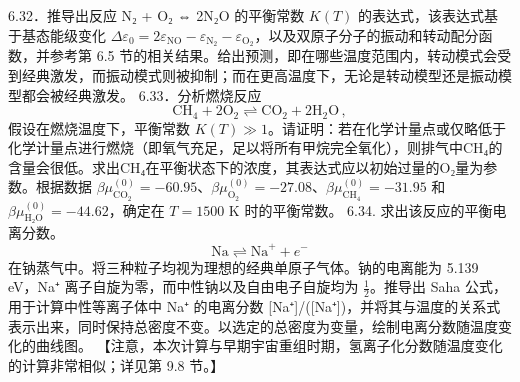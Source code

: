 6.32．推导出反应 N₂ + O₂ ⇔ 2N₂O 的平衡常数 \(K(T)\) 的表达式，该表达式基于基态能级变化 \(\Delta\varepsilon_0 = 2\varepsilon_{\text{NO}} - \varepsilon_{\text{N}_2} - \varepsilon_{\text{O}_2}\)，以及双原子分子的振动和转动配分函数，并参考第 6.5 节的相关结果。给出预测，即在哪些温度范围内，转动模式会受到经典激发，而振动模式则被抑制；而在更高温度下，无论是转动模型还是振动模型都会被经典激发。
6.33．分析燃烧反应
\begin{equation}\tag{6.6.38}\label{eq:6.6.38}
\mathrm { C H } _ { 4 } + 2 \mathrm { O } _ { 2 } \rightleftharpoons \mathrm { C O } _ { 2 } + 2 \mathrm { H } _ { 2 } \mathrm { O } \, ,
\end{equation}
假设在燃烧温度下，平衡常数 \(K(T) \gg 1\)。请证明：若在化学计量点或仅略低于化学计量点进行燃烧（即氧气充足，足以将所有甲烷完全氧化），则排气中CH₄的含量会很低。求出CH₄在平衡状态下的浓度，其表达式应以初始过量的O₂量为参数。根据数据 \(\beta\mu_{\mathrm{CO}_2}^{(0)} = -60.95\)、\(\beta\mu_{\mathrm{O}_2}^{(0)} = -27.08\)、\(\beta\mu_{\mathrm{CH}_4}^{(0)} = -31.95\) 和 \(\beta\mu_{\mathrm{H₂O}}^{(0)} = -44.62\)，确定在 \(T = 1500\) K 时的平衡常数。
6.34. 求出该反应的平衡电离分数。
\begin{equation}\tag{6.6.39}\label{eq:6.6.39}
\mathrm { N a } \rightleftharpoons \mathrm { N a } ^{+} + e ^{-}
\end{equation}
在钠蒸气中。将三种粒子均视为理想的经典单原子气体。钠的电离能为 5.139 eV，Na⁺ 离子自旋为零，而中性钠以及自由电子自旋均为 \(\frac{1}{2}\)。推导出 Saha 公式，用于计算中性等离子体中 Na⁺ 的电离分数 {[}Na⁺{]}/({[}Na⁺{]})，并将其与温度的关系式表示出来，同时保持总密度不变。以选定的总密度为变量，绘制电离分数随温度变化的曲线图。
【注意，本次计算与早期宇宙重组时期，氢离子化分数随温度变化的计算非常相似；详见第 9.8 节。】



